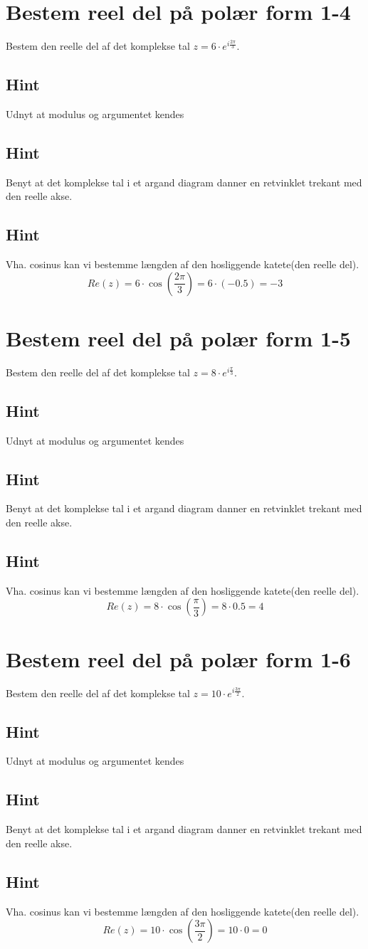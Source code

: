 \documentclass{article}
\newenvironment{exercise}[1]{\newpage\section{#1}}{}
\newcommand{\answerbox}[1]{\fbox{$#1$}}
\newcommand{\hint}{\subsection*{Hint}}
\begin{document}
\newpage

\begin{exercise}{Bestem reel del på polær form 1-4}
	
	Bestem den reelle del af det komplekse tal $z=6 \cdot e^{i \frac{2 \pi}{3}}$.
	
	\answerbox{-3}
	
	
	\hint 
	
	Udnyt at modulus og argumentet kendes
	
	
	\hint
	
	Benyt at det komplekse tal i et argand diagram danner en retvinklet trekant med den reelle akse. 
	
	\hint 
	
	Vha. cosinus kan vi bestemme længden af den hosliggende katete(den reelle del).
	\[
	Re(z) =  6 \cdot \cos\left(\frac{2 \pi}{3} \right) = 6 \cdot (-0.5) = -3
	\]
	
\end{exercise}

\newpage

\begin{exercise}{Bestem reel del på polær form 1-5}
	
	
Bestem den reelle del af det komplekse tal $z=8 \cdot e^{i \frac{\pi}{3}}$.

\answerbox{4}


\hint 

Udnyt at modulus og argumentet kendes


\hint

Benyt at det komplekse tal i et argand diagram danner en retvinklet trekant med den reelle akse. 

\hint 

Vha. cosinus kan vi bestemme længden af den hosliggende katete(den reelle del).
\[
Re(z) =  8 \cdot \cos\left(\frac{\pi}{3} \right) = 8 \cdot 0.5 = 4
\]
	
\end{exercise}

\newpage

\begin{exercise}{Bestem reel del på polær form 1-6}
	
	
Bestem den reelle del af det komplekse tal $z=10 \cdot e^{i \frac{3 \pi}{2}}$.

\answerbox{0}


\hint 

Udnyt at modulus og argumentet kendes


\hint

Benyt at det komplekse tal i et argand diagram danner en retvinklet trekant med den reelle akse. 

\hint 

Vha. cosinus kan vi bestemme længden af den hosliggende katete(den reelle del).
\[
Re(z) =  10 \cdot \cos\left(\frac{3 \pi}{2} \right) = 10 \cdot 0 = 0
\]
	
\end{exercise}
\end{document}
